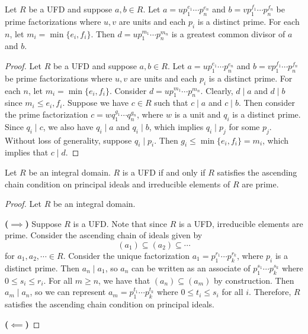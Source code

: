 \documentclass [12pt] {article}
\newenvironment{theorem}[1]{\begin{tcolorbox}[title={Theorem #1},colback=green!5!white,colframe=black!75!green]}{\end{tcolorbox}}
\renewcommand{\bf}[1]{\textbf{{#1}}}
\begin{document}
\begin{theorem}{}
    Let $R$ be a UFD and suppose $a, b \in R$. Let $a = up_1^{e_1} \cdots p_n^{e_n}$ and
    $b = vp_1^{f_1} \cdots p_n^{f_n}$ be prime factorizations where $u, v$ are units and each $p_i$
    is a distinct prime. For each $n$, let $m_i = \min\{ e_i, f_i \}$. Then
    $d = up_1^{m_1} \cdots p_n^{m_n}$ is a greatest common divisor of $a$ and $b$.
\end{theorem}
\begin{proof}
    Let $R$ be a UFD and suppose $a, b \in R$. Let $a = up_1^{e_1} \cdots p_n^{e_n}$ and
    $b = vp_1^{f_1} \cdots p_n^{f_n}$ be prime factorizations where $u, v$ are units and each $p_i$
    is a distinct prime. For each $n$, let $m_i = \min\{ e_i, f_i \}$. Consider
    $d = up_1^{m_1} \cdots p_n^{m_n}$. Clearly, $d \mid a$ and $d \mid b$ since $m_i \leq e_i, f_i$.
    Suppose we have $c \in R$ such that $c \mid a$ and $c \mid b$. Then consider the prime
    factorization $c = wq_1^{g_1} \cdots q_n^{g_n}$, where $w$ is a unit and $q_i$ is a distinct
    prime. Since $q_i \mid c$, we also have $q_i \mid a$ and $q_i \mid b$, which implies
    $q_i \mid p_j$ for some $p_j$. Without loss of generality, suppose $q_i \mid p_i$. Then
    $g_i \leq \min\{ e_i, f_i \} = m_i$, which implies that $c \mid d$.
\end{proof}

\begin{theorem}{}
    Let $R$ be an integral domain. $R$ is a UFD if and only if $R$ satisfies the ascending chain
    condition on principal ideals and irreducible elements of $R$ are prime.
\end{theorem}
\begin{proof}
    Let $R$ be an integral domain.
    \vspace{0.5em}

    \bf{($\bm{\implies}$)}
    Suppose $R$ is a UFD. Note that since $R$ is a UFD, irreducible elements are prime.
    Consider the ascending chain of ideals given by
    \[(a_1) \subseteq (a_2) \subseteq \cdots\]
    for $a_1, a_2, \cdots \in R$. Consider the unique factorization
    $a_1 = p_1^{r_1} \cdots p_k^{r_k}$, where $p_i$ is a distinct prime. Then $a_n \mid a_1$, so
    $a_n$ can be written as an associate of $p_1^{s_1} \cdots p_k^{s_k}$ where
    $0 \leq s_i \leq r_i$. For all $m \geq n$, we have that $(a_n) \subseteq (a_m)$ by construction.
    Then $a_m \mid a_n$, so we can represent $a_m = p_1^{t_1} \cdots p_k^{t_k}$ where
    $0 \leq t_i \leq s_i$ for all $i$. Therefore, $R$ satisfies the ascending chain condition on
    principal ideals.
    \vspace{0.5em}

    \bf{($\bm{\impliedby}$)}

\end{proof}
\end{document}
